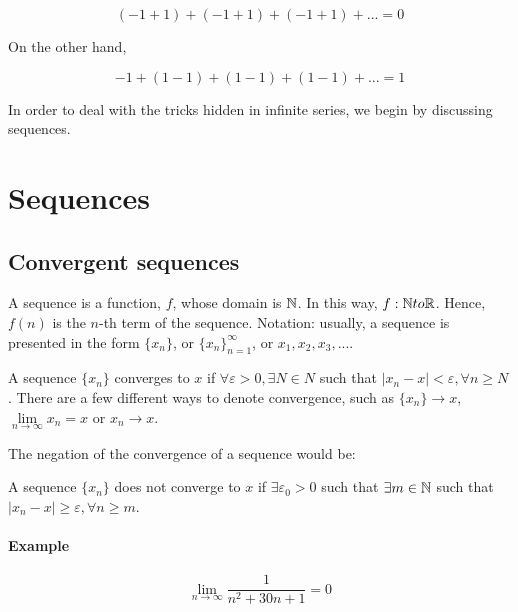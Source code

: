 \begin{equation*}
    (-1 + 1) + (-1 + 1) + (-1 + 1) + ... = 0
\end{equation*}

On the other hand,

\begin{equation*}
    -1 + (1-1) + (1-1) + (1-1) + ... = 1
\end{equation*}

In order to deal with the tricks hidden in infinite series, we begin by discussing sequences.

\section{Sequences}

\subsection{Convergent sequences}

\begin{definition}[Sequence]
    A sequence is a function, $f$, whose domain is $\mathbb{N}$. In this way, $f: \mathbb{N} to \mathbb{R}$. Hence, $f(n)$ is the $n$-th term of the sequence. Notation: usually, a sequence is presented in the form $\{ x_n \}$, or $\{ x_n \}_{n=1}^\infty$, or $ x_1, x_2, x_3, ...$.
\end{definition}

\begin{definition}
    A sequence $\{x_n \}$ converges to $x$ if $\forall \varepsilon > 0, \exists N \in N$ such that $|x_n - x| < \varepsilon, \forall n \geq N$. There are a few different ways to denote convergence, such as $\{ x_n\} \to x$, $\lim \limits_{n \to \infty} x_n = x$ or $x_n \to x$.
\end{definition}

The negation of the convergence of a sequence would be:

\begin{definition}
    A sequence  $\{ x_n\}$ does not converge to $x$ if $\exists \varepsilon_0 > 0$ such that $\exists m \in \mathbb{N}$ such that $|x_n - x| \geq \varepsilon, \forall n \geq m$.
\end{definition}

\paragraph{Example}

\begin{equation*}
    \lim \limits_{n \to \infty} \frac{1}{n^2 + 30n + 1} = 0
\end{equation*}

